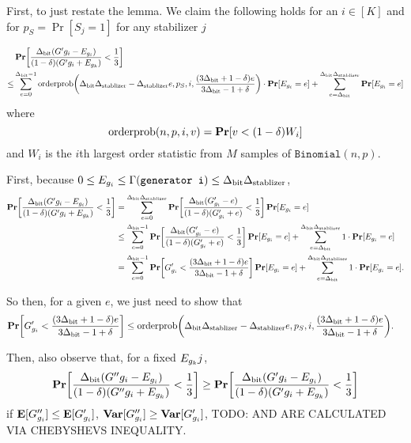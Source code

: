 \newcommand{\orderpinner}{\DegBit\DegStable - \DegStable e, p_S, i, \frac{(3\DegBit + 1 - \delta) e}{3\DegBit -1 + \delta}}

First, to just restate the lemma.
We claim the following holds for an $i \in [K]$ and for $p_S = \Pr[S_j = 1]$ for any stabilizer $j$
	
\begin{align*}
	&\Pr\mleft[\OptVarEq < \frac{1}{3}\mright] \\
	\leq &\sum_{e = 0}^{\DegBit - 1} 
			\OrderP\mleft(\orderpinner\mright) \cdot \Pr[E_{g_i} = e] 
			+ \sum_{e = \DegBit}^{\DegBit\DegStable}\Pr[E_{g_i} = e]
\end{align*}
where
$$
	\OrderP(n, p, i, v) = \Pr\mleft[v < (1 - \delta) W_i \mright]
$$
and $W_i$ is the $i$th largest order statistic from $M$ samples of $\texttt{Binomial}(n, p)$.


First, because $0 \leq E_{g_i} \leq \Gamma(\texttt{generator i}) \leq {\Delta_{\text{bit}}} {\Delta_{\text{stablizer}}}$, 
\begin{align*}
\Pr\mleft[\OptVarEq < \frac{1}{3}\mright] &= 
	\sum_{e = 0}^{\DegBit \DegStable} 
		\Pr\mleft[\frac{\DegBit(G'_{g_i} - e)}{(1 - \delta)(G'_{g_i} + e)} < \frac{1}{3} \mright] \Pr\mleft[E_{g_i} = e\mright]\\
&\leq
	\sum_{e = 0}^{\DegBit - 1} 
		\Pr\mleft[\frac{\DegBit(G'_{g_i} - e)}{(1 - \delta)(G'_{g_i} + e)} < \frac{1}{3} \mright] \Pr\mleft[E_{g_i} = e\mright]
	+ \sum_{e = \DegBit}^{\DegBit \DegStable} 1 \cdot \Pr\mleft[E_{g_i} = e\mright]\\
&=
	\sum_{e = 0}^{\DegBit - 1} 
		\Pr\mleft[G'_{g_i} < \frac{(3 \DegBit + 1 - \delta) e}{3 \DegBit - 1 + \delta} \mright] \Pr\mleft[E_{g_i} = e\mright]
	+ \sum_{e = \DegBit}^{\DegBit \DegStable} 1 \cdot \Pr\mleft[E_{g_i} = e\mright].\\
\end{align*}

So then, for a given $e$,
we just need to show that
\begin{align*}
	\Pr\mleft[G'_{g_i} < \frac{(3 \DegBit + 1 - \delta) e}{3 \DegBit - 1 + \delta} \mright] 
&\leq
	\OrderP\mleft(\orderpinner\mright).
\end{align*}

Then, also observe that, for a fixed $E_{g_k}j$, 
$$
	\Pr\mleft[\OptVarEqChangeable{G''} < \frac{1}{3}\mright] \geq \Pr\mleft[\OptVarEq < \frac{1}{3}\mright]
$$
if $\operatorname*{\mathbf{E}}[G''_{g_i}] \leq \operatorname*{\mathbf{E}}[G'_{g_i}]$, 
$\operatorname*{\mathbf{Var}}[G''_{g_i}] \geq \operatorname*{\mathbf{Var}}[G'_{g_i}]$,
TODO: AND ARE CALCULATED VIA CHEBYSHEVS INEQUALITY.

